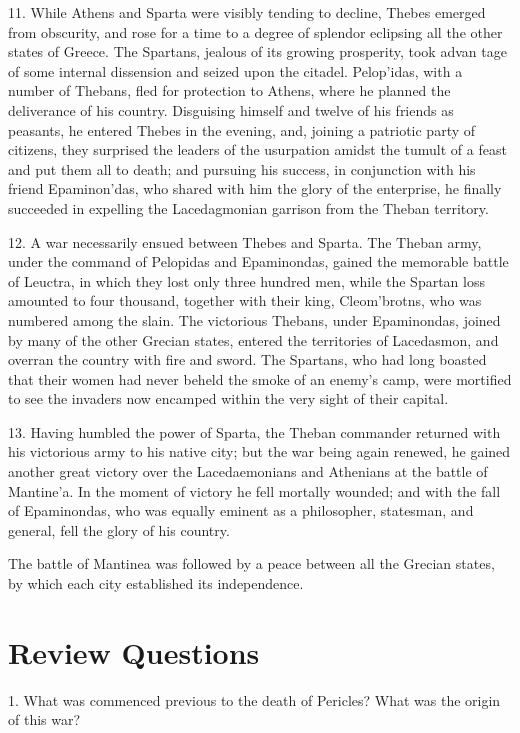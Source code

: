 \documentclass[openany,a4paper]{memoir}
\begin{document}
11. While Athens and Sparta were visibly tending to decline, Thebes emerged from obscurity, and rose for a time to 
a degree of splendor eclipsing all the other states of Greece. 
The Spartans, jealous of its growing prosperity, took advan
tage of some internal dissension and seized upon the citadel. 
Pelop'idas, with a number of Thebans, fled for protection to 
Athens, where he planned the deliverance of his country. 
Disguising himself and twelve of his friends as peasants, he 
entered Thebes in the evening, and, joining a patriotic party 
of citizens, they surprised the leaders of the usurpation 
amidst the tumult of a feast and put them all to death; and 
pursuing his success, in conjunction with his friend Epaminon'das, who shared with him the glory of the enterprise, 
he finally succeeded in expelling the Lacedagmonian garrison 
from the Theban territory. 

12. A war necessarily ensued between Thebes and Sparta. 
The Theban army, under the command of Pelopidas and 
Epaminondas, gained the memorable battle of Leuctra, in 
which they lost only three hundred men, while the Spartan 
loss amounted to four thousand, together with their king, 
Cleom'brotns, who was numbered among the slain. The victorious Thebans, under Epaminondas, joined by many of the 
other Grecian states, entered the territories of Lacedasmon, 
and overran the country with fire and sword. The Spartans, 
who had long boasted that their women had never beheld 
the smoke of an enemy's camp, were mortified to see the 
invaders now encamped within the very sight of their capital. 

13. Having humbled the power of Sparta, the Theban 
commander returned with his victorious army to his native 
city; but the war being again renewed, he gained another 
great victory over the Lacedaemonians and Athenians at the 
battle of Mantine'a. In the moment of victory he fell mortally wounded; and with the fall of Epaminondas, who was 
equally eminent as a philosopher, statesman, and general, fell 
the glory of his country. 

The battle of Mantinea was followed by a peace between 
all the Grecian states, by which each city established its independence. 

\section{Review Questions}


1. What was commenced previous to the death of 
Pericles? What was the origin of this war? 
\end{document}
